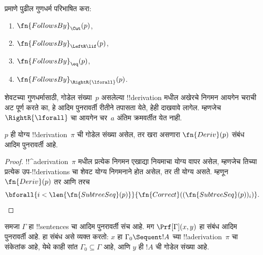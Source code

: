 \documentclass[../../../include/open-logic-section]{subfiles}
\begin{document}
\begin{prob}
   प्रमाणे पुढील गुणधर्म
  परिभाषित करा:
  \begin{enumerate}
  \item $\fn{FollowsBy}_{\Cut}(p)$,
  \item $\fn{FollowsBy}_{\LeftR\lif}(p)$,
  \item $\fn{FollowsBy}_{\eq}(p)$,
  \item $\fn{FollowsBy}_{\RightR{\lforall}}(p)$.
  \end{enumerate}
  शेवटच्या गुणधर्मासाठी, गोडेल संख्या~$p$ असलेल्या
  !!{derivation} मधील अखेरचे निगमन आयगेन चराची अट पूर्ण करते
  का, हे आदिम पुनरावर्ती रीतीने तपासता येते, हेही दाखवावे लागेल.
  म्हणजेच $\RightR{\lforall}$ चा आयगेन चर~$a$ अंतिम
  क्रमवर्तीत येत नाही.
\end{prob}

\begin{prop}
  $p$ ही योग्य !!{derivation}~$\pi$ ची गोडेल संख्या असेल, तर खरा
  असणारा $\fn{Deriv}(p)$ संबंध आदिम पुनरावर्ती आहे.
\end{prop}

\begin{proof}
  !!^a{derivation}~$\pi$ मधील प्रत्येक निगमन एखाद्या नियमाचा योग्य
  वापर असेल, म्हणजेच तिच्या प्रत्येक उप-!!{derivation}s चा शेवट
  योग्य निगमनाने होत असेल, तर ती योग्य असते. म्हणून
  $\fn{Deriv}(p)$ तर आणि तरच
  \[
  \bforall{i<\len{\fn{SubtreeSeq}(p)}}{\fn{Correct}((\fn{SubtreeSeq}(p))_i)}.
  \]
\end{proof}

\begin{prop}
समजा $\Gamma$ हा !!{sentence}s चा आदिम पुनरावर्ती संच आहे.
मग $\Prf[\Gamma](x, y)$ हा संबंध आदिम पुनरावर्ती आहे. हा संबंध
असे व्यक्त करतो: $x$ हा $\Gamma_0 \Sequent !A$ च्या
!!a{derivation}~$\pi$ चा संकेतांक आहे, येथे काही सांत
$\Gamma_0 \subseteq \Gamma$ आहे, आणि $y$ ही $!A$ ची गोडेल संख्या आहे.
\end{prop}
\end{document}
